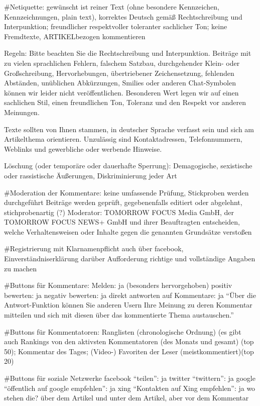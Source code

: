 	
#Netiquette: 
	gewünscht ist reiner Text (ohne besondere Kennzeichen, Kennzeichnungen, plain text), korrektes Deutsch gemäß Rechtschreibung und Interpunktion; freundlicher respektvoller toleranter sachlicher Ton; keine Fremdtexte, ARTIKELbezogen kommentieren
	
	
	Regeln: 
	Bitte beachten Sie die Rechtschreibung und Interpunktion. Beiträge mit zu vielen sprachlichen Fehlern, falschem Satzbau, durchgehender Klein- oder Großschreibung, Hervorhebungen, übertriebener Zeichensetzung, fehlenden Abständen, unüblichen Abkürzungen, Smilies oder anderen Chat-Symbolen können wir leider nicht veröffentlichen.
Besonderen Wert legen wir auf einen sachlichen Stil, einen freundlichen Ton, Toleranz und den Respekt vor anderen Meinungen.


Texte sollten von Ihnen stammen, in deutscher Sprache verfasst sein und sich am Artikelthema orientieren.
Unzulässig sind Kontaktadressen, Telefonnummern, Weblinks und gewerbliche oder werbende Hinweise.

	Löschung (oder temporäre oder dauerhafte Sperrung): Demagogische, sexistische oder rassistische Äußerungen, Diskriminierung jeder Art
	

#Moderation der Kommentare: 
keine umfassende Prüfung, Stickproben werden durchgeführt
Beiträge werden geprüft, gegebenenfalls editiert oder abgelehnt, stichprobenartig (?)
Moderator: TOMORROW FOCUS Media GmbH, der TOMORROW FOCUS NEWS+ GmbH und ihrer Beauftragten entscheiden, welche Verhaltensweisen oder Inhalte gegen die genannten Grundsätze verstoßen


#Registrierung 
	mit Klarnamenpflicht 
	auch über facebook, Einverständniserklärung darüber
	Aufforderung richtige und vollständige Angaben zu machen
	
	
	
#Buttons für Kommentare: 
	Melden: ja (besonders hervorgehoben)
	positiv bewerten: ja
	negativ bewerten: ja
	direkt antworten auf Kommentare: ja ``Über die Antwort-Funktion können Sie anderen Usern Ihre Meinung zu deren Kommentar mitteilen und sich mit diesen über das kommentierte Thema austauschen.''


#Buttons für Kommentatoren: 
	Ranglisten (chronologische Ordnung) (es gibt auch Rankings von den aktivsten Kommentatoren (des Monats und gesamt) (top 50); 
	Kommentar des Tages; 
	(Video-) Favoriten der Leser (meistkommentiert)(top 20)

#Buttons für soziale Netzwerke 
	facebook ``teilen'': ja
	twitter ``twittern'': ja
	google ``öffentlich auf google empfehlen'': ja
	xing ``Kontakten auf Xing empfehlen'': ja
	wo stehen die? über dem Artikel und unter dem Artikel, aber vor dem Kommentar


